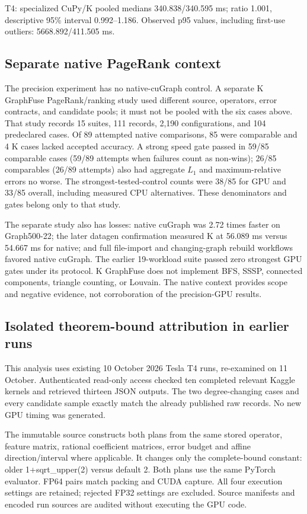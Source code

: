 \documentclass[10pt]{article}
\begin{document}
T4: specialized CuPy/K pooled medians 340.838/340.595 ms; ratio 1.001, descriptive 95\% interval 0.992--1.186. Observed p95 values, including first-use outliers: 5668.892/411.505 ms.

\subsection{Separate native PageRank context}

The precision experiment has no native-cuGraph control. A separate K GraphFuse PageRank/ranking study used different source, operators, error contracts, and candidate pools; it must not be pooled with the six cases above. That study records 15 suites, 111 records, 2,190 configurations, and 104 predeclared cases. Of 89 attempted native comparisons, 85 were comparable and 4 K cases lacked accepted accuracy. A strong speed gate passed in 59/85 comparable cases (59/89 attempts when failures count as non-wins); 26/85 comparables (26/89 attempts) also had aggregate $L_1$ and maximum-relative errors no worse. The strongest-tested-control counts were 38/85 for GPU and 33/85 overall, including measured CPU alternatives. These denominators and gates belong only to that study.

The separate study also has losses: native cuGraph was 2.72 times faster on Graph500-22; the later datagen confirmation measured K at 56.089 ms versus 54.667 ms for native; and full file-import and changing-graph rebuild workflows favored native cuGraph. The earlier 19-workload suite passed zero strongest GPU gates under its protocol. K GraphFuse does not implement BFS, SSSP, connected components, triangle counting, or Louvain. The native context provides scope and negative evidence, not corroboration of the precision-GPU results.

\subsection{Isolated theorem-bound attribution in earlier runs}

This analysis uses existing 10 October 2026 Tesla T4 runs, re-examined on 11 October. Authenticated read-only access checked ten completed relevant Kaggle kernels and retrieved thirteen JSON outputs. The two degree-changing cases and every candidate sample exactly match the already published raw records. No new GPU timing was generated.

The immutable source constructs both plans from the same stored operator, feature matrix, rational coefficient matrices, error budget and affine direction/interval where applicable. It changes only the complete-bound constant: older 1+sqrt\_upper(2) versus default 2. Both plans use the same PyTorch evaluator. FP64 pairs match packing and CUDA capture. All four execution settings are retained; rejected FP32 settings are excluded. Source manifests and encoded run sources are audited without executing the GPU code.
\end{document}
